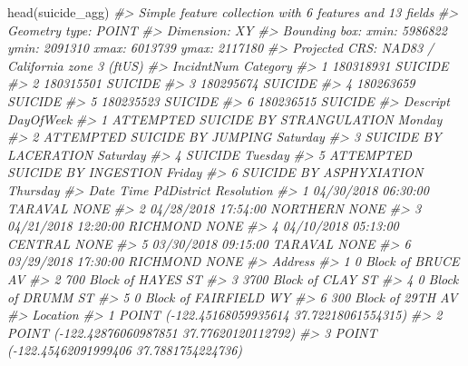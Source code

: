 \documentclass[
]{krantz}
\makeatletter
\newenvironment{Shaded}{\begin{snugshade}}{\end{snugshade}}
\newcommand{\CommentTok}[1]{\textcolor[rgb]{0.37,0.37,0.37}{\textit{#1}}}
\newcommand{\FunctionTok}[1]{\textcolor[rgb]{0,0,0}{#1}}
\newcommand{\NormalTok}[1]{#1}
\newenvironment{kframe}{%
\medskip{}
\setlength{\fboxsep}{.8em}
 \def\at@end@of@kframe{}%
 \ifinner\ifhmode%
  \def\at@end@of@kframe{\end{minipage}}%
  \begin{minipage}{\columnwidth}%
 \fi\fi%
 \def\FrameCommand##1{\hskip\@totalleftmargin \hskip-\fboxsep
 \colorbox{shadecolor}{##1}\hskip-\fboxsep
     \hskip-\linewidth \hskip-\@totalleftmargin \hskip\columnwidth}%
 \MakeFramed {\advance\hsize-\width
   \@totalleftmargin\z@ \linewidth\hsize
   \@setminipage}}%
 {\par\unskip\endMakeFramed%
 \at@end@of@kframe}
\renewenvironment{Shaded}{\begin{kframe}}{\end{kframe}}
\makeatother
\begin{document}
\begin{Shaded}
\begin{Highlighting}[]
\FunctionTok{head}\NormalTok{(suicide\_agg)}
\CommentTok{\#\textgreater{} Simple feature collection with 6 features and 13 fields}
\CommentTok{\#\textgreater{} Geometry type: POINT}
\CommentTok{\#\textgreater{} Dimension:     XY}
\CommentTok{\#\textgreater{} Bounding box:  xmin: 5986822 ymin: 2091310 xmax: 6013739 ymax: 2117180}
\CommentTok{\#\textgreater{} Projected CRS: NAD83 / California zone 3 (ftUS)}
\CommentTok{\#\textgreater{}   IncidntNum Category}
\CommentTok{\#\textgreater{} 1  180318931  SUICIDE}
\CommentTok{\#\textgreater{} 2  180315501  SUICIDE}
\CommentTok{\#\textgreater{} 3  180295674  SUICIDE}
\CommentTok{\#\textgreater{} 4  180263659  SUICIDE}
\CommentTok{\#\textgreater{} 5  180235523  SUICIDE}
\CommentTok{\#\textgreater{} 6  180236515  SUICIDE}
\CommentTok{\#\textgreater{}                             Descript DayOfWeek}
\CommentTok{\#\textgreater{} 1 ATTEMPTED SUICIDE BY STRANGULATION    Monday}
\CommentTok{\#\textgreater{} 2       ATTEMPTED SUICIDE BY JUMPING  Saturday}
\CommentTok{\#\textgreater{} 3              SUICIDE BY LACERATION  Saturday}
\CommentTok{\#\textgreater{} 4                            SUICIDE   Tuesday}
\CommentTok{\#\textgreater{} 5     ATTEMPTED SUICIDE BY INGESTION    Friday}
\CommentTok{\#\textgreater{} 6            SUICIDE BY ASPHYXIATION  Thursday}
\CommentTok{\#\textgreater{}         Date     Time PdDistrict Resolution}
\CommentTok{\#\textgreater{} 1 04/30/2018 06:30:00    TARAVAL       NONE}
\CommentTok{\#\textgreater{} 2 04/28/2018 17:54:00   NORTHERN       NONE}
\CommentTok{\#\textgreater{} 3 04/21/2018 12:20:00   RICHMOND       NONE}
\CommentTok{\#\textgreater{} 4 04/10/2018 05:13:00    CENTRAL       NONE}
\CommentTok{\#\textgreater{} 5 03/30/2018 09:15:00    TARAVAL       NONE}
\CommentTok{\#\textgreater{} 6 03/29/2018 17:30:00   RICHMOND       NONE}
\CommentTok{\#\textgreater{}                   Address}
\CommentTok{\#\textgreater{} 1     0 Block of BRUCE AV}
\CommentTok{\#\textgreater{} 2   700 Block of HAYES ST}
\CommentTok{\#\textgreater{} 3   3700 Block of CLAY ST}
\CommentTok{\#\textgreater{} 4     0 Block of DRUMM ST}
\CommentTok{\#\textgreater{} 5 0 Block of FAIRFIELD WY}
\CommentTok{\#\textgreater{} 6    300 Block of 29TH AV}
\CommentTok{\#\textgreater{}                                         Location}
\CommentTok{\#\textgreater{} 1  POINT ({-}122.45168059935614 37.72218061554315)}
\CommentTok{\#\textgreater{} 2  POINT ({-}122.42876060987851 37.77620120112792)}
\CommentTok{\#\textgreater{} 3   POINT ({-}122.45462091999406 37.7881754224736)}

\end{Highlighting}
\end{Shaded}
\end{document}

